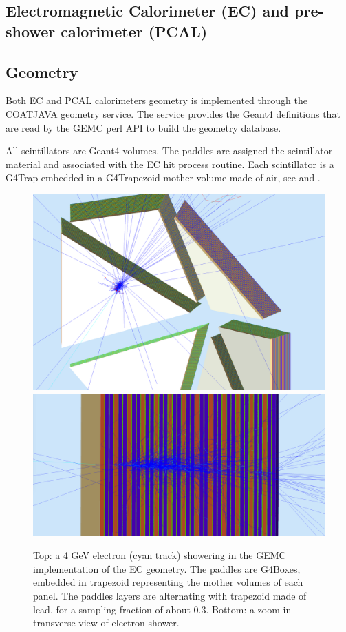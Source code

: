 \subsection{Electromagnetic Calorimeter (EC) and pre-shower calorimeter (PCAL)}

\subsection{Geometry}

Both EC and PCAL calorimeters geometry is implemented through the COATJAVA geometry service.
The service provides the Geant4 definitions that are read by the GEMC perl API to build the geometry database.

All scintillators are Geant4 volumes. The paddles are assigned the scintillator material and associated with the EC hit process routine.
Each scintillator is a G4Trap embedded in a G4Trapezoid mother volume made of air, see  and  .

\begin{figure}
	\centering
	\includegraphics[width=0.95\columnwidth,keepaspectratio]{img/ecGeometry.png}
	\includegraphics[width=0.95\columnwidth,keepaspectratio]{img/ecDetail.png}
	\caption{Top: a 4 GeV electron (cyan track) showering in the GEMC implementation of the EC geometry.
            The paddles are G4Boxes, embedded in trapezoid representing the mother volumes of each panel.
            The paddles layers are alternating with trapezoid made of lead, for a sampling fraction of about 0.3.
            Bottom: a zoom-in transverse view of electron shower.}
	\label{fig:ecGeometry}
\end{figure}

